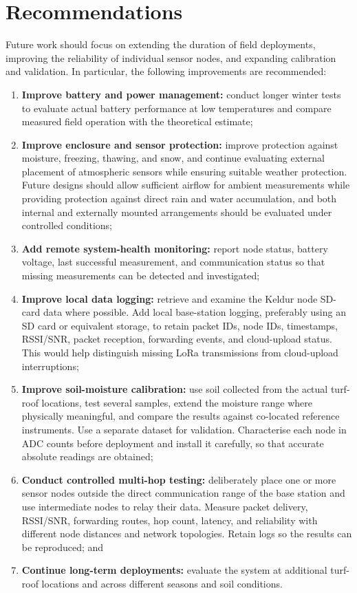 \section{Recommendations}
Future work should focus on extending the duration of field deployments, improving the reliability of individual sensor nodes, and expanding calibration and validation. In particular, the following improvements are recommended:
\begin{enumerate}
\item \textbf{Improve battery and power management:} conduct longer winter tests to evaluate actual battery performance at low temperatures and compare measured field operation with the theoretical estimate;
\item \textbf{Improve enclosure and sensor protection:} improve protection against moisture, freezing, thawing, and snow, and continue evaluating external placement of atmospheric sensors while ensuring suitable weather protection. Future designs should allow sufficient airflow for ambient measurements while providing protection against direct rain and water accumulation, and both internal and externally mounted arrangements should be evaluated under controlled conditions;
\item \textbf{Add remote system-health monitoring:} report node status, battery voltage, last successful measurement, and communication status so that missing measurements can be detected and investigated;
\item \textbf{Improve local data logging:} retrieve and examine the Keldur node SD-card data where possible. Add local base-station logging, preferably using an SD card or equivalent storage, to retain packet IDs, node IDs, timestamps, RSSI/SNR, packet reception, forwarding events, and cloud-upload status. This would help distinguish missing LoRa transmissions from cloud-upload interruptions;
\item \textbf{Improve soil-moisture calibration:} use soil collected from the actual turf-roof locations, test several samples, extend the moisture range where physically meaningful, and compare the results against co-located reference instruments. Use a separate dataset for validation. Characterise each node in ADC counts before deployment and install it carefully, so that accurate absolute readings are obtained;
\item \textbf{Conduct controlled multi-hop testing:} deliberately place one or more sensor nodes outside the direct communication range of the base station and use intermediate nodes to relay their data. Measure packet delivery, RSSI/SNR, forwarding routes, hop count, latency, and reliability with different node distances and network topologies. Retain logs so the results can be reproduced; and
\item \textbf{Continue long-term deployments:} evaluate the system at additional turf-roof locations and across different seasons and soil conditions.
\end{enumerate}

